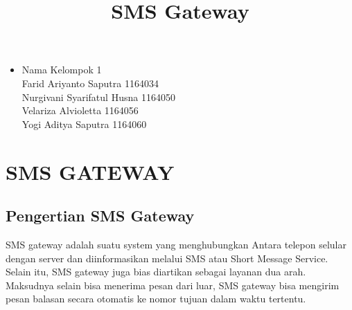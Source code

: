 \documentclass[12pt,a4paper]{article}
\begin{document}
\title{SMS Gateway}
\maketitle

\begin{itemize}
\item
Nama Kelompok 1\\
Farid Ariyanto Saputra 1164034\\
Nurgivani Syarifatul Husna 1164050\\
Velariza Alvioletta 1164056\\
Yogi Aditya Saputra 1164060 \\
\end{itemize}

\section{SMS GATEWAY}
\subsection{Pengertian SMS Gateway}
SMS gateway adalah suatu system yang menghubungkan Antara telepon selular dengan server dan diinformasikan melalui SMS atau Short Message Service. Selain itu, SMS gateway juga bias diartikan sebagai layanan dua arah. Maksudnya selain bisa menerima pesan dari luar,  SMS gateway bisa mengirim pesan balasan secara otomatis ke nomor tujuan dalam waktu tertentu.
\end{document}
